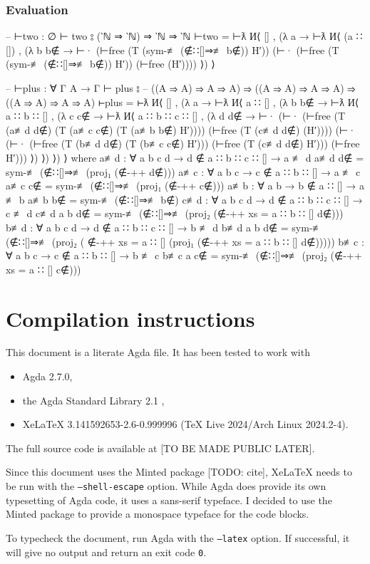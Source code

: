 \documentclass[logo,bsc,singlespacing,parskip,online]{infthesis}
\renewenvironment{code}{\mintedcopy[breaklines,breaksymbolleft=\;]{agda}}{\endmintedcopy}
\begin{document}
\subsection{Evaluation}
\label{appendix:evaluation_proofs}
\begin{code}
-- ⊢two : ∅ ⊢ two ⦂ (‵ℕ ⇒ ‵ℕ) ⇒ ‵ℕ ⇒ ‵ℕ
⊢two = ⊢ƛ
  И⟨ []
  , (λ a → ⊢ƛ
    И⟨ (a ∷ [])
    , (λ b {b∉} →
      ⊢·
      (⊢free (T (sym-≢ (∉∷[]⇒≢ b∉)) H′))
      (⊢· (⊢free (T (sym-≢ (∉∷[]⇒≢ b∉)) H′)) (⊢free (H′)))) ⟩) ⟩

-- ⊢plus : ∀ {Γ A} → Γ ⊢ plus ⦂
-- ((A ⇒ A) ⇒ A ⇒ A) ⇒ ((A ⇒ A) ⇒ A ⇒ A) ⇒ ((A ⇒ A) ⇒ A ⇒ A)
⊢plus = ⊢ƛ
  И⟨ []
  , (λ a → ⊢ƛ
    И⟨ a ∷ []
    , (λ b {b∉} → ⊢ƛ
      И⟨ a ∷ b ∷ []
      , (λ c {c∉} → ⊢ƛ
        И⟨ a ∷ b ∷ c ∷ []
        , (λ d {d∉} →
        ⊢·
          (⊢·
            (⊢free (T (a≢d d∉) (T (a≢c c∉) (T (a≢b b∉) H′))))
            (⊢free (T (c≢d d∉) (H′))))
          (⊢·
            (⊢·
              (⊢free (T (b≢d d∉) (T (b≢c c∉) H′)))
              (⊢free (T (c≢d d∉) H′)))
            (⊢free H′))) ⟩) ⟩) ⟩) ⟩
  where
    a≢d : ∀ {a b c d} → d ∉ a ∷ b ∷ c ∷ [] → a ≢ d
    a≢d d∉ = sym-≢ (∉∷[]⇒≢ (proj₁ (∉-++ d∉)))
    a≢c : ∀ {a b c} → c ∉ a ∷ b ∷ [] → a ≢ c
    a≢c c∉ = sym-≢ (∉∷[]⇒≢ (proj₁ (∉-++ c∉)))
    a≢b : ∀ {a b} → b ∉ a ∷ [] → a ≢ b
    a≢b b∉ = sym-≢ (∉∷[]⇒≢ b∉)
    c≢d : ∀ {a b c d} → d ∉ a ∷ b ∷ c ∷ [] → c ≢ d
    c≢d {a} {b} d∉ =
      sym-≢ (∉∷[]⇒≢ (proj₂ (∉-++ {xs = a ∷ b ∷ []} d∉)))
    b≢d : ∀ {a b c d} → d ∉ a ∷ b ∷ c ∷ [] → b ≢ d
    b≢d {a} {b} d∉ =
      sym-≢ (∉∷[]⇒≢ (proj₂ (
        ∉-++
          {xs = a ∷ []}
          (proj₁ (∉-++ {xs = a ∷ b ∷ []} d∉)))))
    b≢c : ∀ {a b c} → c ∉ a ∷ b ∷ [] → b ≢ c
    b≢c {a} c∉ = sym-≢ (∉∷[]⇒≢ (proj₂ (∉-++ {xs = a ∷ []} c∉)))
\end{code}

\chapter{Compilation instructions}
\label{appendix:compilation_instructions}

This document is a literate Agda file. It has been tested to work with
\begin{itemize}
  \item Agda 2.7.0,
  \item the Agda Standard Library 2.1 \citep{the_agda_community_agda_2024},
  \item XeLaTeX 3.141592653-2.6-0.999996 (TeX Live 2024/Arch Linux 2024.2-4).
\end{itemize}

The full source code is available at [TO BE MADE PUBLIC LATER].

Since this document uses the Minted package [TODO: cite], XeLaTeX needs to be run with the
\texttt{--shell-escape} option. While Agda does provide its own typesetting of Agda code, it uses a
sans-serif typeface. I decided to use the Minted package to provide a monospace typeface for the
code blocks.

To typecheck the document, run Agda with the \texttt{--latex} option. If successful, it will give no
output and return an exit code \texttt{0}.
\end{document}

